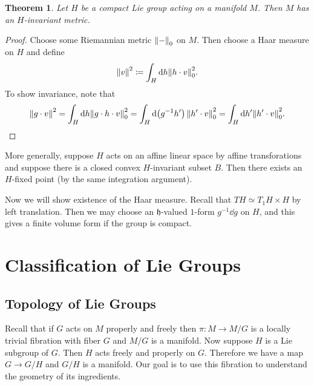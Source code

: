 \documentclass[leqno, openany]{memoir}
\newtheorem{thm}{Theorem}[section]
\theoremstyle{definition}
\theoremstyle{remark}
\theoremstyle{plain}
\theoremstyle{definition}
\theoremstyle{remark}
\newcommand{\mf}[1]{\mathfrak{#1}}
\begin{document}
\begin{thm} Let $H$ be a compact Lie group acting on a manifold $M$. Then $M$
has an $H$-invariant metric.  \end{thm}

\begin{proof} Choose some Riemannian metric $\norm{-}_0$ on $M$. Then choose a
    Haar measure on $H$ and define \[ \norm{v}^2 \coloneqq \int_H \dd h \norm{h
        \cdot v}_0^2. \] To show invariance, note that \[ \norm{g \cdot v}^2 =
    \int_H \dd h \norm{g \cdot h \cdot v}_0^2 = \int_H \dd(g^{-1}h') \norm{h'
\cdot v}_0^2 = \int_H \dd h' \norm{h' \cdot v}_0^2. \qedhere \] \end{proof}

More generally, suppose $H$ acts on an affine linear space by affine
transforations and suppose there is a closed convex $H$-invariant subset $B$.
Then there exists an $H$-fixed point (by the same integration argument).

Now we will show existence of the Haar measure. Recall that $T H \simeq T_1 H
\times H$ by left translation. Then we may choose an $\mf{h}$-valued $1$-form
$g^{-1} \dd g$ on $H$, and this gives a finite volume form if the group is
compact.

\chapter{Classification of Lie Groups}%
\label{cha:classification_of_lie_groups}

\section{Topology of Lie Groups}%

Recall that if $G$ acts on $M$ properly and freely then $\pi: M \to M/G$ is a
locally trivial fibration with fiber $G$ and $M/G$ is a manifold. Now suppose
$H$ is a Lie subgroup of $G$. Then $H$ acts freely and properly on $G$.
Therefore we have a map $G \to G/H$ and $G/H$ is a manifold. Our goal is to use
this fibration to understand the geometry of its ingredients.
\end{document}
